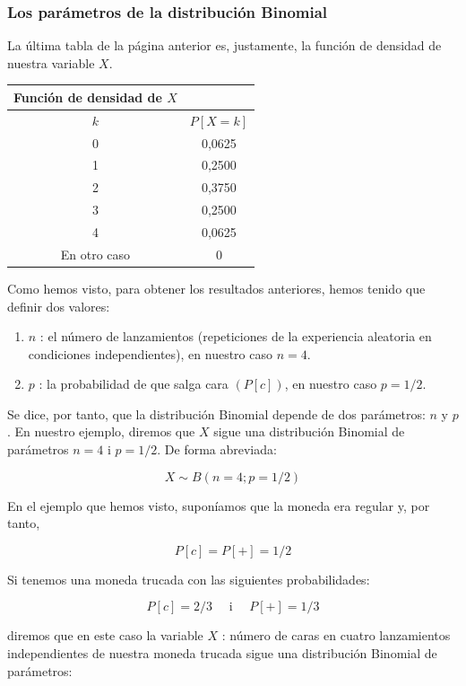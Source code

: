 \documentclass[
  a4paper,
  DIV=11,
  numbers=noendperiod]{scrreprt}
\providecommand{\tightlist}{%
  \setlength{\itemsep}{0pt}\setlength{\parskip}{0pt}}\usepackage{longtable,booktabs,array}
\begin{document}
\subsubsection{Los parámetros de la distribución
Binomial}\label{los-paruxe1metros-de-la-distribuciuxf3n-binomial}

La última tabla de la página anterior es, justamente, la función de
densidad de nuestra variable \(X\).

\begin{longtable}[]{@{}cc@{}}
\toprule\noalign{}
Función de densidad de \(X\) & \\
\midrule\noalign{}
\endhead
\bottomrule\noalign{}
\endlastfoot
\(k\) & \(P[X=k]\) \\
0 & 0,0625 \\
1 & 0,2500 \\
2 & 0,3750 \\
3 & 0,2500 \\
4 & 0,0625 \\
En otro caso & 0 \\
\end{longtable}

Como hemos visto, para obtener los resultados anteriores, hemos tenido
que definir dos valores:

\begin{enumerate}
\def\labelenumi{\arabic{enumi}.}
\tightlist
\item
  \(n\) : el número de lanzamientos (repeticiones de la experiencia
  aleatoria en condiciones independientes), en nuestro caso \(n=4\).
\item
  \(p\) : la probabilidad de que salga cara \((P[c])\), en nuestro caso
  \(p=1 / 2\).
\end{enumerate}

Se dice, por tanto, que la distribución Binomial depende de dos
parámetros: \(n\) y \(p\). En nuestro ejemplo, diremos que \(X\) sigue
una distribución Binomial de parámetros \(n=4\) i \(p=1 / 2\). De forma
abreviada:

\[
X \sim B(n=4 ; p=1 / 2)
\]

En el ejemplo que hemos visto, suponíamos que la moneda era regular y,
por tanto,

\[
P[c]=P[+]=1 / 2
\]

Si tenemos una moneda trucada con las siguientes probabilidades:

\[
P[c]=2 / 3 \quad \text { i } \quad P[+]=1 / 3
\]

diremos que en este caso la variable \(X\) : número de caras en cuatro
lanzamientos independientes de nuestra moneda trucada sigue una
distribución Binomial de parámetros:
\end{document}
